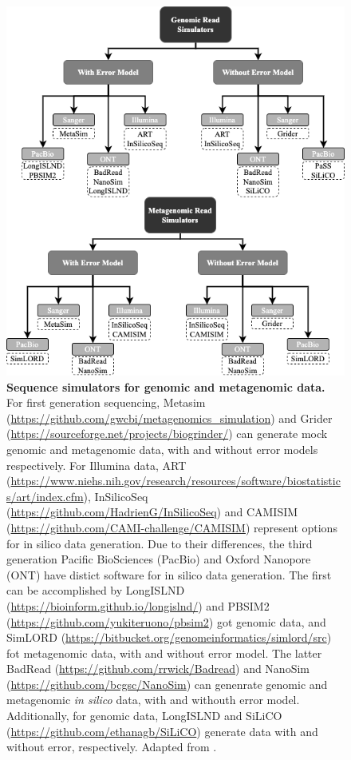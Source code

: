 \begin{figure}[h!]
\centering
\includegraphics[width=\textwidth]{figures/introduction/Figure 7.png}
\caption{\textbf{Sequence simulators for genomic and metagenomic data.} For first generation sequencing, Metasim (\url{https://github.com/gwcbi/metagenomics_simulation}) and Grider (\url{https://sourceforge.net/projects/biogrinder/}) can generate mock genomic and metagenomic data, with and without error models respectively. For Illumina data, ART (\url{https://www.niehs.nih.gov/research/resources/software/biostatistics/art/index.cfm}), InSilicoSeq (\url{https://github.com/HadrienG/InSilicoSeq}) and CAMISIM (\url{https://github.com/CAMI-challenge/CAMISIM}) represent options for in silico data generation. Due to their differences, the third generation Pacific BioSciences (PacBio) and Oxford Nanopore (ONT) have distict software for in silico data generation. The first can be accomplished by LongISLND (\url{https://bioinform.github.io/longislnd/}) and PBSIM2 (\url{https://github.com/yukiteruono/pbsim2}) got genomic data, and SimLORD (\url{https://bitbucket.org/genomeinformatics/simlord/src}) fot metagenomic data, with and without error model. The latter BadRead (\url{https://github.com/rrwick/Badread}) and NanoSim (\url{https://github.com/bcgsc/NanoSim}) can genenrate genomic and metagenomic \textit{in silico} data, with and withouth error model. Additionally, for genomic data, LongISLND and SiLiCO (\url{https://github.com/ethanagb/SiLiCO}) generate data with and without error, respectively. Adapted from \cite{escalona_comparison_2016}.}
\label{fig:figure7}
\end{figure}

